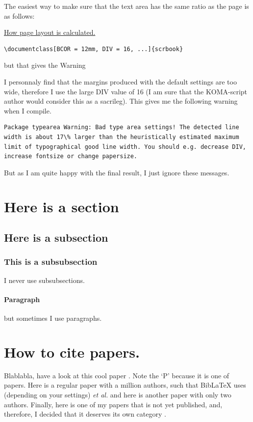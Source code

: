 The easiest way to make sure that the text area has the same ratio as the page is as follows:

\href{https://markov.htwsaar.de/tex-archive/macros/latex/contrib/koma-script/doc/scrguide-en.pdf}{How page layout is calculated.}

\begin{lstlisting}
\documentclass[BCOR = 12mm, DIV = 16, ...]{scrbook}
\end{lstlisting}


but that gives the Warning

I personnaly find that the margins produced with the default settings are too wide, therefore I use the large DIV value of 16 (I am sure that the KOMA-script author would consider this as a sacrileg). This gives me the following warning when I compile.

\begin{lstlisting}
Package typearea Warning: Bad type area settings! The detected line width is about 17\% larger than the heuristically estimated maximum limit of typographical good line width. You should e.g. decrease DIV, increase fontsize or change papersize.
\end{lstlisting}

But as I am quite happy with the final result, I just ignore these messages.



\blindtext
\section{Here is a section}
\blindtext
\subsection{Here is a subsection}
\blindtext
\subsubsection{This is a subsubsection}
I never use subsubsections.
\paragraph{Paragraph} but sometimes I use paragraphs.
\section{How to cite papers.}
Blablabla, have a look at this cool paper \cite{berke_transmon_2022}. Note the `P' because it is one of  papers. Here is a regular paper \cite{aruteQuantumSupremacyUsing2019a} with a million authors, such that BibLaTeX uses (depending on your settings) \textit{et al.} and here is another paper \cite{magesan_effective_2020} with only two authors. Finally, here is one of my papers that is not yet published, and, therefore, I decided that it deserves its own category \cite{inpreparation}.

